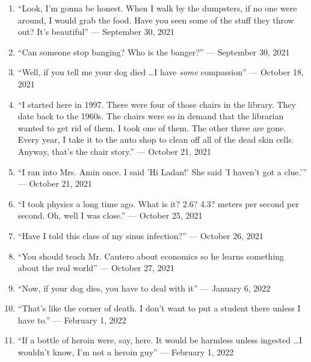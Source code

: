 \documentclass[12pt]{article}
\begin{document}
\begin{enumerate}
  \item “Look, I'm gonna be honest. When I walk by the dumpsters, if no one were around, I would grab the food. Have you seen some of the stuff they throw out? It's beautiful” — September 30, 2021

  \item “Can someone stop banging? Who is the banger?” — September 30, 2021

  \item “Well, if you tell me your dog died \dots I have \textit{some} compassion” — October 18, 2021

  \item “I started here in 1997. There were four of those chairs in the library. They date back to the 1960s. The chairs were so in demand that the librarian wanted to get rid of them. I took one of them. The other three are gone. Every year, I take it to the auto shop to clean off all of the dead skin cells. Anyway, that's the chair story.” — October 21, 2021

  \item “I ran into Mrs. Amin once. I said 'Hi Ladan!' She said 'I haven't got a clue.'” — October 21, 2021 

  \item “I took physics a long time ago. What is it? 2.6? 4.3? meters per second per second. Oh, well I was close.” — October 25, 2021

  \item “Have I told this class of my sinus infection?” — October 26, 2021

  \item “You should teach Mr. Cautero about economics so he learns something about the real world” — October 27, 2021


  \item “Now, if your dog dies, you have to deal with it” — January 6, 2022

  \item “That's like the corner of death. I don't want to put a student there unless I have to.” — February 1, 2022

  \item ``If a bottle of heroin were, say, here. It would be harmless unless ingested \dots I wouldn't know, I'm not a heroin guy'' — February 1, 2022

\end{enumerate}
\end{document}
